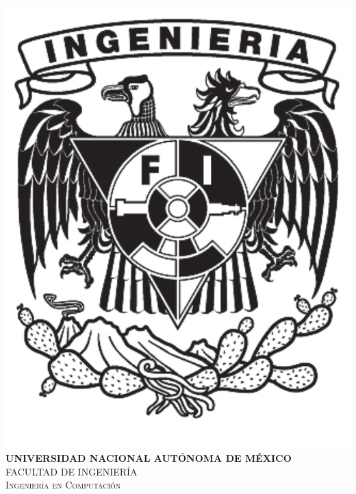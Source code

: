 \documentclass[12pt, a4paper]{article}
\begin{document}
\begin{titlepage}
		\includegraphics[scale = .32]{img/fi.png}\\[.65cm] %
		
		\textsc{\large \bfseries UNIVERSIDAD NACIONAL AUTÓNOMA DE MÉXICO}\\[.5 cm] %
		\textsc{\large FACULTAD DE INGENIERÍA}\\[0.5 cm] %
		\textsc{\large Ingeniería en Computación}\\[1.4 cm] %
		

\end{titlepage}
\end{document}
